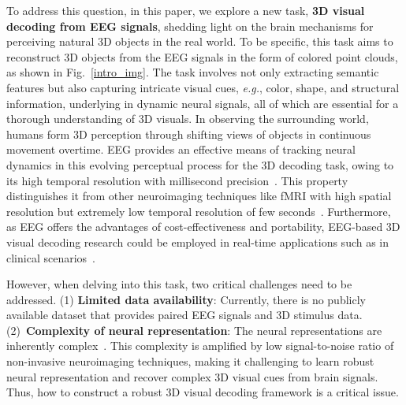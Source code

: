 To address this question, in this paper, we explore a new task, \textbf{3D visual decoding from EEG signals}, shedding light on the brain mechanisms for perceiving natural 3D objects in the real world.  To be specific, this task aims to reconstruct 3D objects from the EEG signals in the form of colored point clouds, as shown in Fig.~\ref{intro_img}.
The task involves not only extracting semantic features but also capturing intricate visual cues, \textit{e.g.}, color, shape, and structural information, underlying in dynamic neural signals, all of which are essential for a thorough understanding of 3D visuals.
In observing the surrounding world, humans 
form 3D perception through shifting views of objects in continuous movement overtime.
EEG provides an effective means of tracking neural dynamics in this evolving perceptual process for the 3D decoding task, owing to its high temporal resolution with millisecond precision~\cite{engel1994fmri,gifford2022large}. This property
distinguishes it from other neuroimaging techniques like fMRI with high spatial resolution but extremely low temporal resolution of few seconds~\cite{engel1994fmri}. 
Furthermore, as EEG offers the advantages of cost-effectiveness and portability, EEG-based 3D visual decoding research could be employed in real-time applications such as in clinical scenarios~\cite{metzger2023high,moses2021neuroprosthesis}. 



However, when delving into this task, two critical challenges need to be addressed.
(1) \textbf{Limited data availability}: 
Currently, there is no publicly available dataset that provides paired EEG signals and 3D stimulus data. 
(2)~\textbf{Complexity of neural representation}:
The neural representations are inherently complex~\cite{hebb2005organization}. 
This complexity is amplified by low signal-to-noise ratio of non-invasive neuroimaging techniques, making it challenging to learn robust neural representation and recover complex 3D visual cues from brain signals.
Thus, how to construct a robust 3D visual decoding framework is a critical issue.


